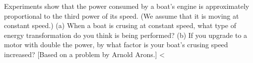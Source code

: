  Experiments show that the power consumed by a boat's
engine is approximately proportional to the third power of its
speed. (We assume that it is moving at constant speed.) (a)
When a boat is crusing at constant speed, what type of
energy transformation do you think is being performed? (b)
If you upgrade to a motor with double the power, by what
factor is your boat's crusing speed increased? [Based on a
problem by Arnold Arons.] <%

